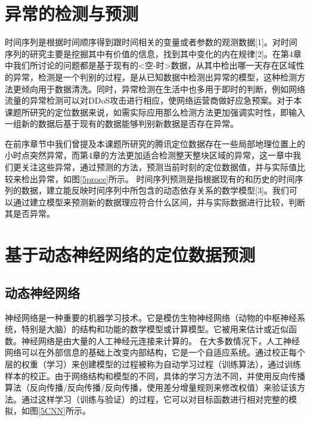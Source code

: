 \documentclass[a4paper,AutoFakeBold,oneside,12pt]{book}
\begin{document}
\section{异常的检测与预测}
	时间序列是根据时间顺序得到跟时间相关的变量或者参数的观测数据[1]。对时间序列的研究主要是挖掘其中有价值的信息，找到其中变化的内在规律[2]。在第4章中我们所讨论的问题都是基于现有的<空-时>数据，从其中检出哪一天存在区域性的异常，检测是一个判别的过程，是从已知数据中检测出异常的模型，这种检测方法更倾向用于数据清洗。同时，异常检测在生活中也多用于即时的判断，例如网络流量的异常检测可以对DDoS攻击进行相应，使网络运营商做好应急预案。对于本课题所研究的定位数据来说，如需实际应用那么检测方法更加强调实时性，即输入一组新的数据后基于现有的数据能够判别新数据是否存在异常。


	在前序章节中我们曾提及本课题所研究的腾讯定位数据存在一些局部地理位置上的小时点突然异常，而第4章的方法更加适合检测整天整块区域的异常，这一章中我们更关注这些异常，通过预测的方法，预测当前时刻的定位数据值，并与实际值比较来检出异常，如图\ref{5proce}所示。
	时间序列预测是指根据现有的和历史的时间序列的数据，建立能反映时间序列中所包含的动态依存关系的数学模型[3]。我们可以通过建立模型来预测新的数据理应符合什么区间，并与实际数据进行比较，判断其是否异常。


\section{基于动态神经网络的定位数据预测}
\subsection{动态神经网络}
	神经网络是一种重要的机器学习技术。它是模仿生物神经网络（动物的中枢神经系统，特别是大脑）的结构和功能的数学模型或计算模型。它被用来估计或近似函数。神经网络是由大量的人工神经元连接来计算的。
	在大多数情况下，人工神经网络可以在外部信息的基础上改变内部结构，它是一个自适应系统。通过校正每个层的权重（学习）来创建模型的过程被称为自动学习过程（训练算法），通过训练样本的校正。由于网络结构和模型的不同，具体的学习方法不同，并使用反向传播算法（反向传播/反向传播/反向传播，使用差分增量规则来修改权值）来验证该方法。通过这样学习（训练与验证）的过程，它可以对目标函数进行相对完整的模拟，如图\ref{5CNN}所示。

\end{document}
